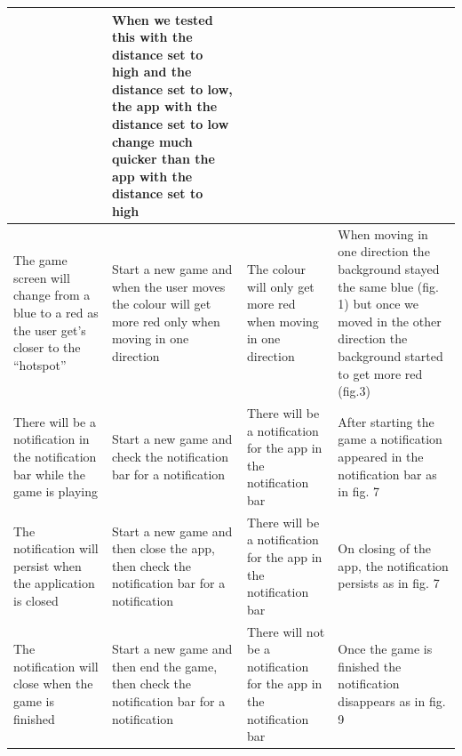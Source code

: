 \documentclass[10pt, a4paper]{article}
\begin{document}
\begin{tabular}{| p{} | p{} | p{} | p{} |}
& When we tested this with the distance set to high and the distance set to low, the app with the distance set to low change much quicker than the app with the distance set to high \\ 
\hline
The game screen will change from a blue to a red as the user get's closer to the ``hotspot''
& Start a new game and when the user moves the colour will get more red only when moving in one direction
& The colour will only get more red when moving in one direction
& When moving in one direction the background stayed the same blue (fig. 1) but once we moved in the other direction the background started to get more red (fig.3) \\ 
\hline 
There will be a notification in the notification bar while the game is playing
& Start a new game and check the notification bar for a notification
& There will be a notification for the app in the notification bar
& After starting the game a notification appeared in the notification bar as in fig. 7 \\ 
\hline 
The notification will persist when the application is closed
& Start a new game and then close the app, then check the notification bar for a notification
& There will be a notification for the app in the notification bar
& On closing of the app, the notification persists as in fig. 7 \\ 
\hline 
The notification will close when the game is finished
& Start a new game and then end the game, then check the notification bar for a notification
& There will not be a notification for the app in the notification bar
& Once the game is finished the notification disappears as in fig. 9 \\ 
\hline 
\end{tabular} 
\end{document}
